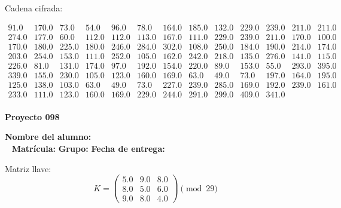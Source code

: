 \documentclass[12pt]{article}
\begin{document}
Cadena cifrada:
\begin{center}
$\begin{array}{lllllllllllll}
91.0 & 170.0 & 73.0 & 54.0 & 96.0 & 78.0 & 164.0 & 185.0 & 132.0 & 229.0 & 239.0 & 211.0 & 211.0\\
274.0 & 177.0 & 60.0 & 112.0 & 112.0 & 113.0 & 167.0 & 111.0 & 229.0 & 239.0 & 211.0 & 170.0 & 100.0\\
170.0 & 180.0 & 225.0 & 180.0 & 246.0 & 284.0 & 302.0 & 108.0 & 250.0 & 184.0 & 190.0 & 214.0 & 174.0\\
203.0 & 254.0 & 153.0 & 111.0 & 252.0 & 105.0 & 162.0 & 242.0 & 218.0 & 135.0 & 276.0 & 141.0 & 115.0\\
226.0 & 81.0 & 131.0 & 174.0 & 97.0 & 192.0 & 154.0 & 220.0 & 89.0 & 153.0 & 55.0 & 293.0 & 395.0\\
339.0 & 155.0 & 230.0 & 105.0 & 123.0 & 160.0 & 169.0 & 63.0 & 49.0 & 73.0 & 197.0 & 164.0 & 195.0\\
125.0 & 138.0 & 103.0 & 63.0 & 49.0 & 73.0 & 227.0 & 239.0 & 285.0 & 169.0 & 192.0 & 239.0 & 161.0\\
233.0 & 111.0 & 123.0 & 160.0 & 169.0 & 229.0 & 244.0 & 291.0 & 299.0 & 409.0 & 341.0\\
\end{array}$
\end{center}

\newpage


\textbf{Proyecto 098}

\textbf{Nombre del alumno:} \underline{\hspace{13cm}}\\\
\vspace{1cm}
\textbf{Matrícula:} \underline{\hspace{4cm}} \hspace{1cm}
\textbf{Grupo:} \underline{\hspace{2cm}}
\textbf{Fecha de entrega:} \underline{\hspace{2cm}}

\medskip

Matriz llave:
\[
K = \begin{pmatrix}
5.0 & 9.0 & 8.0\\
8.0 & 5.0 & 6.0\\
9.0 & 8.0 & 4.0
\end{pmatrix} \pmod{29}
\]
\end{document}
